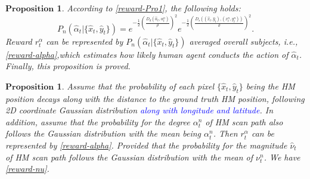 \documentclass[10pt,journal,compsoc]{IEEEtran}
\newtheorem{proposition}[theorem]{$\textbf{Proposition}$}
\begin{document}
\begin{proposition}
    According to \eqref{reward-Pro1}, the following holds:
    \begin{equation}
        \label{reward-Pro6}
        P_{n}(\hat{\alpha}_{t}|\{\hat{x}_{t},\hat{y}_{t}\}) = e^{-\frac{1}{2}\left(\frac{D_d(\hat{\alpha}_{t}, \alpha^n_{t})}{\rho}\right)^2} e^{-\frac{1}{2}\left(\frac{D_s((\hat{x}_{t},\hat{y}_{t}),(x^n_{t},y^n_{t}))}{\varrho}\right)^2}.
    \end{equation}
    Reward $r^{\alpha}_t$ can be represented by $P_{n}(\hat{\alpha}_{t}|\{\hat{x}_{t},\hat{y}_{t}\})$ averaged overall subjects, i.e., \eqref{reward-alpha},which estimates how likely human agent conducts the action of $\hat{\alpha}_{t}$. Finally, this proposition is proved.
\end{proposition}

\begin{proposition}
    \label{lemma4}
    Assume that the probability of each pixel $\{\hat{x}_{t},\hat{y}_{t}\}$ being the HM position decays along with the distance to the ground truth HM position, following 2D coordinate Gaussian distribution \textcolor{blue}{along with longitude and latitude}.
    In addition, assume that the probability for the degree $\alpha^{n}_{t}$ of HM scan path also follows the Gaussian distribution with the mean being $\alpha^{n}_{t}$.
    Then $r^{\alpha}_t$ can be represented by \eqref{reward-alpha}.
    Provided that the probability for the magnitude $\hat{\nu}_{t}$ of HM scan path follows the Gaussian distribution with the mean of $\nu^{n}_{t}$.
    We have \eqref{reward-nu}.


\end{proposition}
\end{document}
